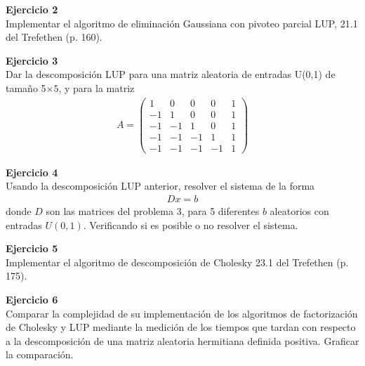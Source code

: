 \documentclass[a4paper, 11pt]{article}
\newenvironment{problem}[2][Ejercicio]
{ \begin{mdframed}[backgroundcolor= red!50] \textbf{#1 #2} \\}
	{  \end{mdframed}}
\begin{document}
\begin{problem}{2}
    Implementar el algoritmo de eliminación Gaussiana con pivoteo parcial LUP, 21.1 del Trefethen (p. 160).
\end{problem}
    
\begin{problem}{3}
    Dar la descomposición LUP para una matriz aleatoria de entradas U(0,1) de tamaño 5$\times 5$, y para la matriz
    \begin{align}
        A = \begin{pmatrix}
            1 &0  &0  &0 &1 \\ 
            -1 &1  &0  &0 &1 \\ 
            -1 &-1  &1 &0  &1 \\ 
            -1 &-1  &-1  &1 &1\\
            -1 & -1 & -1 & -1 &1 
            \end{pmatrix}
    \end{align}
\end{problem}


\begin{problem}{4}
    Usando la descomposición LUP anterior, resolver el sistema de la forma
    \begin{align}
        Dx = b 
    \end{align}
    donde $D$ son las matrices del problema 3, para 5 diferentes $b$ aleatorios con entradas $U(0,1)$. Verificando si es posible o no resolver el sistema.
\end{problem}


\begin{problem}{5}
    Implementar el algoritmo de descomposición de Cholesky 23.1 del Trefethen (p. 175).
\end{problem}

\begin{problem}{6}
    Comparar la complejidad de su implementación de los algoritmos de factorización de Cholesky y LUP mediante la medición de los tiempos que tardan con respecto a la descomposición de una matriz aleatoria hermitiana definida positiva. Graficar la comparación.
\end{problem}
\end{document}

